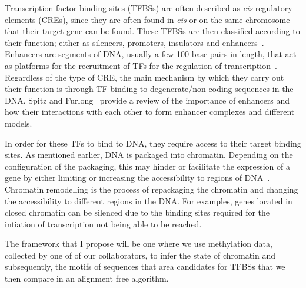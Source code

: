        Transcription factor binding sites (TFBSs) are often described as \emph{cis}-regulatory elements (CREs), since they are often found in \emph{cis} or on the same chromosome that their target gene can be found. These TFBSs are then classified according to their function; either as silencers, promoters, insulators and enhancers~\cite{gaszner2006insulators, gross1988nuclease, li1999locus}. Enhancers are segments of DNA, usually a few 100 base pairs in length, that act as platforms for the recruitment of TFs for the regulation of transcription~\cite{spitz2012transcription}. Regardless of the type of CRE, the main mechanism by which they carry out their function is through TF binding to degenerate/non-coding sequences in the DNA. Spitz and Furlong~\cite{spitz2012transcription} provide a review of the importance of enhancers and how their interactions with each other to form enhancer complexes and different models. 
        
        In order for these TFs to bind to DNA, they require access to their target binding sites. As mentioned earlier, DNA is packaged into chromatin. Depending on the configuration of the packaging, this may hinder or facilitate the expression of a gene by either limiting or increasing the accessibility to regions of DNA~\cite{li2007role}. Chromatin remodelling is the process of repackaging the chromatin and changing the accessibility to different regions in the DNA. For examples, genes located in closed chromatin can be silenced due to the binding sites required for the intiation of transcription not being able to be reached.

        
        The framework that I propose will be one where we use methylation data, collected by one of of our collaborators, to infer the state of chromatin and subsequently, the motifs of sequences that area candidates for TFBSs that we then compare in an alignment free algorithm.

        
        
        
